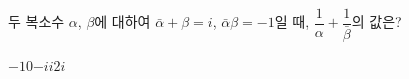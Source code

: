 두 복소수 $\alpha$, $\beta$에 대하여 $\bar{\alpha}+\beta=i$, $\bar{\alpha}\beta=-1$일 때, $\dfrac{1}{\alpha}+\dfrac{1}{\bar{\beta}}$의 값은? 
\begin{choices32}{$-1$}{$0$}{$-i$}{$i$}{$2i$}\end{choices32}
